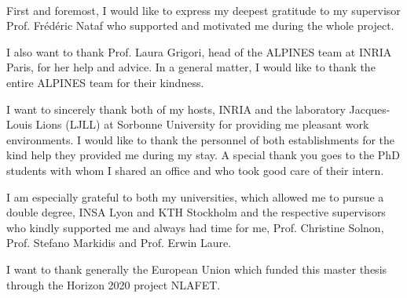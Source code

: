 \paragraph{}
First and foremost, I would like to express my deepest gratitude to my supervisor Prof. Frédéric Nataf who supported and motivated me during the whole project.

I also want to thank Prof. Laura Grigori, head of the ALPINES team at INRIA Paris, for her help and advice.
In a general matter, I would like to thank the entire ALPINES team for their kindness.

I want to sincerely thank both of my hosts, INRIA and the laboratory Jacques-Louis Lions (LJLL) at Sorbonne University for providing me pleasant work environments.
I would like to thank the personnel of both establishments for the kind help they provided me during my stay.
A special thank you goes to the PhD students with whom I shared an office and who took good care of their intern.

I am especially grateful to both my universities, which allowed me to pursue a double degree, INSA Lyon and KTH Stockholm and the respective supervisors who kindly supported me and always had time for me, Prof. Christine Solnon, Prof. Stefano Markidis and Prof. Erwin Laure.

I want to thank generally the European Union which funded this master thesis through the Horizon 2020 project NLAFET.
